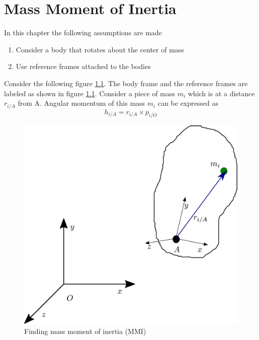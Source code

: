 \chapter{Mass Moment of Inertia}

In this chapter the following assumptions are made
\begin{enumerate}
	\item Consider a body that rotates about the center of mass
	\item Use reference frames attached to the bodies
\end{enumerate}

Consider the following figure \ref{Fig_0_ch_5_MMI1}. The body frame and the reference frames are labeled as shown in figure \ref{Fig_0_ch_5_MMI1}. Consider a piece of mass $m_{i}$ which is at a distance $r_{i/A}$ from A. Angular momentum of this mass $m_{i}$ can be expressed as
\begin{equation}
	h_{i/A} = r_{i/A} \times p_{i/O}
\end{equation}
\begin{figure}[h!]
	\centering
	\includegraphics[width=0.6\linewidth]{Bilder/20_MMI_1.pdf}
	\caption{Finding mass moment of inertia (MMI)}
	\label{Fig_0_ch_5_MMI1}
\end{figure}

